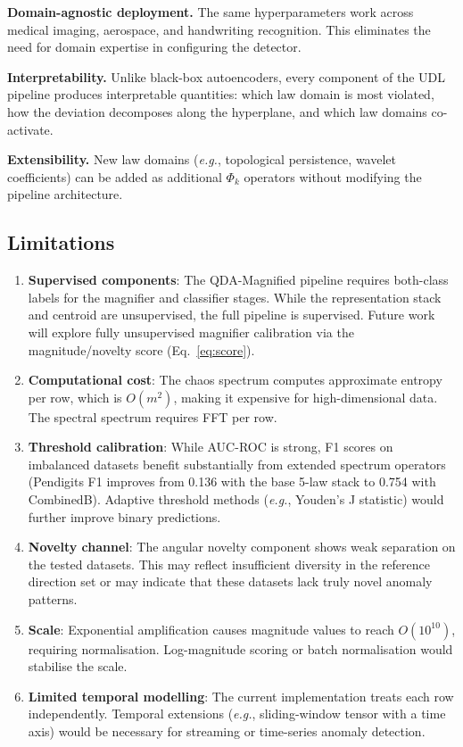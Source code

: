 \documentclass[journal]{IEEEtran}
\newcommand{\eg}{\textit{e.g.}}
\begin{document}
\textbf{Domain-agnostic deployment.} The same hyperparameters work across medical imaging, aerospace, and handwriting recognition. This eliminates the need for domain expertise in configuring the detector.

\textbf{Interpretability.} Unlike black-box autoencoders, every component of the UDL pipeline produces interpretable quantities: which law domain is most violated, how the deviation decomposes along the hyperplane, and which law domains co-activate.

\textbf{Extensibility.} New law domains (\eg, topological persistence, wavelet coefficients) can be added as additional $\Phi_k$ operators without modifying the pipeline architecture.

\subsection{Limitations}

\begin{enumerate}
  \item \textbf{Supervised components}: The QDA-Magnified pipeline requires both-class labels for the magnifier and classifier stages. While the representation stack and centroid are unsupervised, the full pipeline is supervised. Future work will explore fully unsupervised magnifier calibration via the magnitude/novelty score (Eq.~\eqref{eq:score}).
  \item \textbf{Computational cost}: The chaos spectrum computes approximate entropy per row, which is $O(m^2)$, making it expensive for high-dimensional data. The spectral spectrum requires FFT per row.
  \item \textbf{Threshold calibration}: While AUC-ROC is strong, F1 scores on imbalanced datasets benefit substantially from extended spectrum operators (Pendigits F1 improves from 0.136 with the base 5-law stack to 0.754 with CombinedB). Adaptive threshold methods (\eg, Youden's J statistic) would further improve binary predictions.
  \item \textbf{Novelty channel}: The angular novelty component shows weak separation on the tested datasets. This may reflect insufficient diversity in the reference direction set or may indicate that these datasets lack truly novel anomaly patterns.
  \item \textbf{Scale}: Exponential amplification causes magnitude values to reach $O(10^{10})$, requiring normalisation. Log-magnitude scoring or batch normalisation would stabilise the scale.
  \item \textbf{Limited temporal modelling}: The current implementation treats each row independently. Temporal extensions (\eg, sliding-window tensor with a time axis) would be necessary for streaming or time-series anomaly detection.
\end{enumerate}
\end{document}
